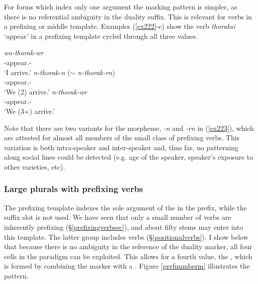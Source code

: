 For  forms which index only one argument the marking pattern is simpler, as there is no referential ambiguity in the duality suffix. This is relevant for verbs in a prefixing or middle template. Examples (\ref{ex222}-c) show the verb \emph{thoraksi} `appear' in a prefixing template cycled through all three  values.

\begin{exe}
\ex
\begin{xlist}
	\ex
	\gll \emph{wo-thorak-wr}\\
	\Fsg-appear.\Ext-\Ndu\\
	\trans `I arrive.'
	\label{ex222}
	\ex
	\gll \emph{n-thorak-n} ($\sim$ \emph{n-thorak-rn})\\
	\Fnsg-appear.\Ext-{\Du}\\
	\trans `We (2) arrive.'
	\label{ex223}
	\ex
	\gll \emph{n-thorak-wr}\\
	\Fnsg-appear.\Ext-\Ndu\\
	\trans `We (3+) arrive.'
	\label{ex224}
\end{xlist}
\end{exe}

Note that there are two variants for the  morpheme, \emph{-n} and \emph{-rn} in (\ref{ex223}), which are attested for almost all members of the small class of prefixing verbs. This variation is both intra-speaker and inter-speaker and, thus far, no patterning along social lines could be detected (e.g. age of the speaker, speaker's exposure to other varieties, etc).

\subsubsection{Large plurals with prefixing verbs} \label{positonalnumber}

The prefixing template indexes the sole argument of the  in the prefix, while the suffix slot is not used. We have seen that only a small number of verbs are inherently prefixing ({\S}\ref{prefixingverbsec}), and about fifty stems may enter into this template. The latter group includes  verbs ({\S}\ref{positionalverbs}). I show below that because there is no ambiguity in the reference of the duality marker, all four cells in the paradigm can be exploited. This allows for a fourth  value, the , which is formed by combining the  marker with a . Figure \ref{prefnumberm} illustrates the pattern.

